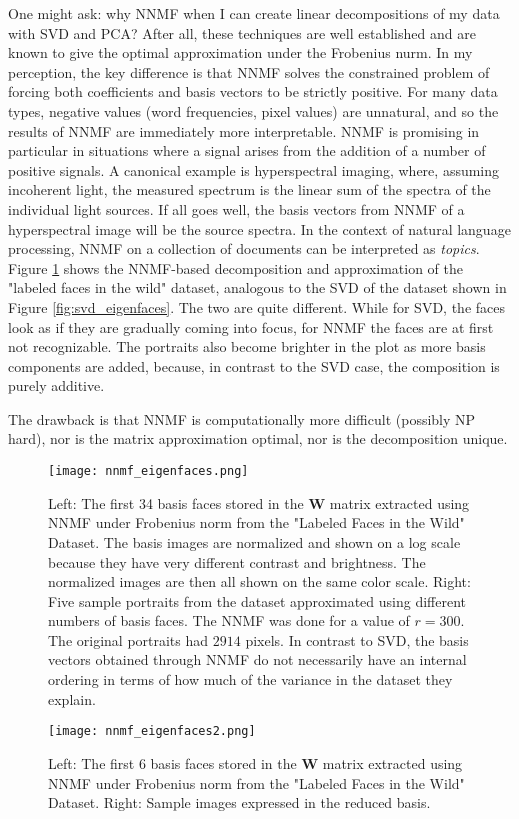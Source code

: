 One might ask: why NNMF when I can create linear decompositions of my data with SVD and PCA? After all, these techniques are well established and are known to give the optimal approximation under the Frobenius nurm. In my perception, the key difference is that NNMF solves the constrained problem of forcing both coefficients and basis vectors to be strictly positive. For many data types, negative values (word frequencies, pixel values) are unnatural, and so the results of NNMF are immediately more interpretable. NNMF is promising in particular in situations where a signal arises from the addition of a number of positive signals. A canonical example is hyperspectral imaging, where, assuming incoherent light, the measured spectrum is the linear sum of the spectra of the individual light sources. If all goes well, the basis vectors from NNMF of a hyperspectral image will be the source spectra. In the context of natural language processing, NNMF on a collection of documents can be interpreted as \textit{topics}. Figure \ref{fig:nnmf_eigenfaces} shows the NNMF-based decomposition and approximation of the "labeled faces in the wild" dataset, analogous to the SVD of the dataset shown in Figure \ref{fig:svd_eigenfaces}. The two are quite different. While for SVD, the faces look as if they are gradually coming into focus, for NNMF the faces are at first not recognizable. The portraits also become brighter in the plot as more basis components are added, because, in contrast to the SVD case, the composition is purely additive.  

The drawback is that NNMF is computationally more difficult (possibly NP hard), nor is the matrix approximation optimal, nor is the decomposition unique. 


\begin{figure}
\centering
    \texttt{[image: nnmf\_eigenfaces.png]}
    \caption{Left: The first 34 basis faces stored in the $\mathbf{W}$ matrix extracted using NNMF under Frobenius norm from the "Labeled Faces in the Wild" Dataset. The basis images are normalized and shown on a log scale because they have very different contrast and brightness. The normalized images are then all shown on the same color scale. Right: Five sample portraits from the dataset approximated using different numbers of basis faces. The NNMF was done for a value of $r=300$. The original portraits had $2914$ pixels. In contrast to SVD, the basis vectors obtained through NNMF do not necessarily have an internal ordering in terms of how much of the variance in the dataset they explain.}
    \label{fig:nnmf_eigenfaces}
\end{figure}


\begin{figure}
\centering
    \texttt{[image: nnmf\_eigenfaces2.png]}
    \caption{Left: The first 6 basis faces stored in the $\mathbf{W}$ matrix extracted using NNMF under Frobenius norm from the "Labeled Faces in the Wild" Dataset. Right: Sample images expressed in the reduced basis.}
    \label{fig:nnmf_eigenfaces2}
\end{figure}